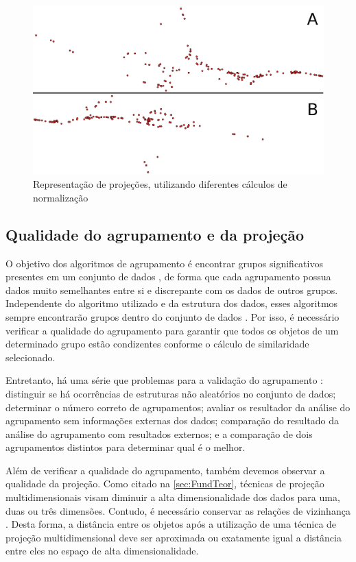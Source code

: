 			\begin{figure}[h]
				\centering
				\includegraphics[width=0.7\linewidth]{imagem/projecoes}
				\caption{Representação de projeções, utilizando diferentes cálculos de normalização}
				\label{fig:projecoes}
			\end{figure}
		
		\subsection{Qualidade do agrupamento e da projeção}
		\label{sebsec:qualidade}
			O objetivo dos algoritmos de agrupamento é encontrar grupos significativos
			presentes em um conjunto de dados \cite{Halkidi2001}, de forma que cada agrupamento
			possua dados muito semelhantes entre si e discrepante com os dados de outros grupos.
			Independente do algoritmo utilizado e da estrutura dos dados,
			esses algoritmos sempre encontrarão grupos dentro do conjunto de dados
			\cite{Tan:2005:ch8}. Por isso, é necessário verificar a qualidade do
			agrupamento para garantir que todos os objetos de um determinado grupo
			estão condizentes conforme o cálculo de similaridade selecionado.
			
			Entretanto, há uma série que problemas para a validação do agrupamento
			\cite{Tan:2005:ch8}: distinguir se há ocorrências de estruturas não aleatórios
			no conjunto de dados; determinar o número correto de agrupamentos; avaliar
			os resultador da análise do agrupamento sem informações externas dos dados;
			comparação do resultado da análise do agrupamento com resultados externos;
			e a comparação de dois agrupamentos distintos para determinar qual é o melhor.
			
			Além de verificar a qualidade do agrupamento, também devemos observar a
			qualidade da projeção. Como citado na \cref{sec:FundTeor}, técnicas de projeção
			multidimensionais visam diminuir a alta dimensionalidade dos dados para uma, duas
			ou três dimensões. Contudo, é necessário conservar as relações de vizinhança
			\cite{bauer1992quantifying}. Desta forma, a distância entre os objetos após a
			utilização de uma técnica de projeção multidimensional deve ser aproximada
			ou exatamente igual a distância entre eles no espaço de alta dimensionalidade.
			
